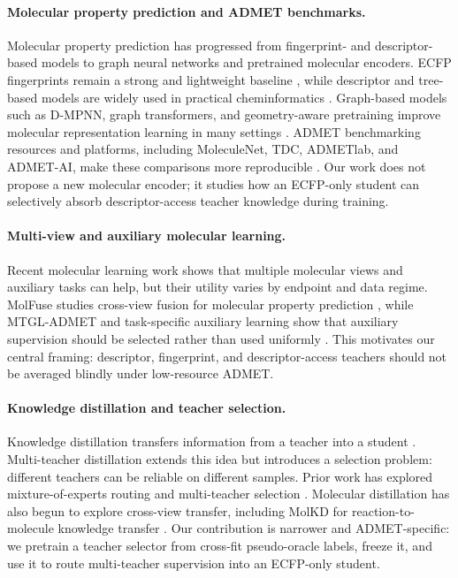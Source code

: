 \documentclass[11pt]{article}
\begin{document}
\paragraph{Molecular property prediction and ADMET benchmarks.}
Molecular property prediction has progressed from fingerprint- and
descriptor-based models to graph neural networks and pretrained molecular
encoders. ECFP fingerprints remain a strong and lightweight baseline
\cite{Rogers2010}, while descriptor and tree-based models are widely used in
practical cheminformatics \cite{Breiman2001,Chen2016XGBoost,Tian2022ADMETBoost}.
Graph-based models such as D-MPNN, graph transformers, and geometry-aware
pretraining improve molecular representation learning in many settings
\cite{Yang2019DMPNN,Rong2020GROVER,Hu2020PretrainGNN,Liu2022GraphMVP}. ADMET
benchmarking resources and platforms, including MoleculeNet, TDC, ADMETlab,
and ADMET-AI, make these comparisons more reproducible
\cite{Wu2018MoleculeNet,Huang2021TDC,Xiong2021ADMETlab,Swanson2024ADMETAI}.
Our work does not propose a new molecular encoder; it studies how an ECFP-only
student can selectively absorb descriptor-access teacher knowledge during
training.

\paragraph{Multi-view and auxiliary molecular learning.}
Recent molecular learning work shows that multiple molecular views and
auxiliary tasks can help, but their utility varies by endpoint and data regime.
MolFuse studies cross-view fusion for molecular property prediction
\cite{Zheng2024MolFuse}, while MTGL-ADMET and task-specific auxiliary learning
show that auxiliary supervision should be selected rather than used uniformly
\cite{Du2023MTGLADMET,Dey2024AuxAdapt}. This motivates our central framing:
descriptor, fingerprint, and descriptor-access teachers should not be averaged
blindly under low-resource ADMET.

\paragraph{Knowledge distillation and teacher selection.}
Knowledge distillation transfers information from a teacher into a student
\cite{Hinton2015}. Multi-teacher distillation extends this idea but introduces
a selection problem: different teachers can be reliable on different samples.
Prior work has explored mixture-of-experts routing and multi-teacher selection
\cite{Jacobs1991MoE,Shi2021ReinforcedMTS,Liu2021AdaptiveMTKD,Zhang2022CAMKD}.
Molecular distillation has also begun to explore cross-view transfer, including
MolKD for reaction-to-molecule knowledge transfer \cite{Zeng2024MolKD}. Our
contribution is narrower and ADMET-specific: we pretrain a teacher selector
from cross-fit pseudo-oracle labels, freeze it, and use it to route
multi-teacher supervision into an ECFP-only student.
\end{document}
